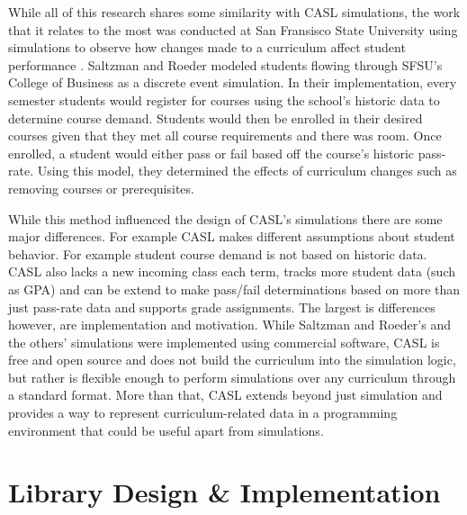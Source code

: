 \documentclass[botnum, fleqn]{unmeethesis}
\begin{document}
    While all of this research shares some similarity with CASL simulations, the work that it relates to the most was conducted at San Fransisco State University using simulations to observe how changes made to a curriculum affect student performance \cite{saltzman2012simulating}. Saltzman and Roeder modeled students flowing through SFSU's College of Business as a discrete event simulation. In their implementation, every semester students would register for courses using the school's historic data to determine course demand. Students would then be enrolled in their desired courses given that they met all course requirements and there was room. Once enrolled, a student would either pass or fail based off the course's historic pass-rate. Using this model, they determined the effects of curriculum changes such as removing courses or prerequisites. 

    While this method influenced the design of CASL's simulations there are some major differences. For example CASL makes different assumptions about student behavior. For example student course demand is not based on historic data. CASL also lacks a new incoming class each term, tracks more student data (such as GPA) and can be extend to make pass/fail determinations based on more than just pass-rate data and supports grade assignments. The largest is differences however, are implementation and motivation. While Saltzman and Roeder's and the others' simulations were implemented using commercial software, CASL is free and open source and does not build the curriculum into the simulation logic, but rather is flexible enough to perform simulations over any curriculum through a standard format. More than that, CASL extends beyond just simulation and provides a way to represent curriculum-related data in a programming environment that could be useful apart from simulations.

\chapter{Library Design \& Implementation}
\end{document}
